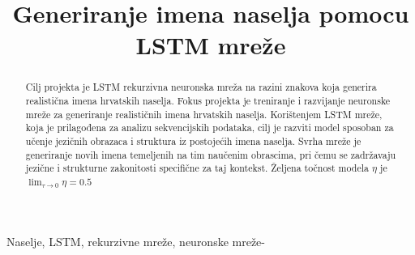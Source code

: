 \documentclass[conference]{IEEEtran}
\begin{document}
\title{Generiranje imena naselja pomocu LSTM mreže}


\author{
\and
{}
\and
{}
\and
{}
\and
{}
\and
{}
}

\maketitle

\begin{abstract}
Cilj projekta je LSTM rekurzivna neuronska mreža na razini znakova koja generira realistična imena hrvatskih naselja. Fokus projekta je treniranje i razvijanje neuronske mreže za generiranje realističnih imena hrvatskih naselja. Korištenjem LSTM mreže, koja je prilagođena za analizu sekvencijskih podataka, cilj je razviti model sposoban za učenje jezičnih obrazaca i struktura iz postojećih imena naselja. Svrha mreže je generiranje novih imena temeljenih na tim naučenim obrascima, pri čemu se zadržavaju jezične i strukturne zakonitosti specifične za taj kontekst.
Željena točnost modela $\eta$ je $\lim_{\tau \to 0} \eta = 0.5$
\end{abstract}

\begin{IEEEkeywords}
Naselje, LSTM, rekurzivne mreže, neuronske mreže-
\end{IEEEkeywords}
\end{document}
